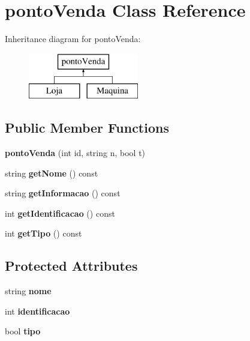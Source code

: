 \hypertarget{classpontoVenda}{}\section{ponto\+Venda Class Reference}
\label{classpontoVenda}
Inheritance diagram for ponto\+Venda\+:\begin{figure}[H]
\begin{center}
\leavevmode
\includegraphics[height=2.000000cm]{classpontoVenda}
\end{center}
\end{figure}
\subsection*{Public Member Functions}
\begin{DoxyCompactItemize}
\item 
\mbox{\label{classpontoVenda_ab92199860478714402c6b0211217cf55}} 
{\bfseries ponto\+Venda} (int id, string n, bool t)
\item 
\mbox{\label{classpontoVenda_a58d395f89a39f0de272b6a731be8e990}} 
string {\bfseries get\+Nome} () const
\item 
\mbox{\label{classpontoVenda_aee0e8681a4aac8fc1beb2f2108ca3c51}} 
string {\bfseries get\+Informacao} () const
\item 
\mbox{\label{classpontoVenda_ae534dbba18ae6de0947b2d55035b1821}} 
int {\bfseries get\+Identificacao} () const
\item 
\mbox{\label{classpontoVenda_a650e2cc8401ba31a29b6cbce59550905}} 
int {\bfseries get\+Tipo} () const
\end{DoxyCompactItemize}
\subsection*{Protected Attributes}
\begin{DoxyCompactItemize}
\item 
\mbox{\label{classpontoVenda_afabcbbe69835966d8058fb65b4d07651}} 
string {\bfseries nome}
\item 
\mbox{\label{classpontoVenda_a682ca0ae7d336a39f23e26827bd3b1ae}} 
int {\bfseries identificacao}
\item 
\mbox{\label{classpontoVenda_a93c604341b1cc52d3a62726273129e49}} 
bool {\bfseries tipo}
\end{DoxyCompactItemize}


